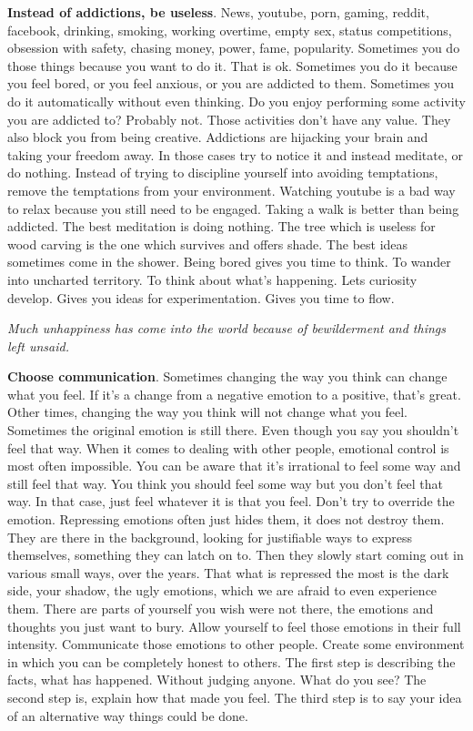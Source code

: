 \documentclass[a4paper,hidelinks]{article}
\begin{document}
\textbf{Instead of addictions, be useless}.
News, youtube, porn, gaming, reddit, facebook, drinking, smoking, working overtime, empty sex, status competitions, obsession with safety, chasing money, power, fame, popularity.
Sometimes you do those things because you want to do it.
That is ok.
Sometimes you do it because you feel bored, or you feel anxious, or you are addicted to them.
Sometimes you do it automatically without even thinking.
Do you enjoy performing some activity you are addicted to?
Probably not.
Those activities don't have any value.
They also block you from being creative.
Addictions are hijacking your brain and taking your freedom away.
In those cases try to notice it and instead meditate, or do nothing.
Instead of trying to discipline yourself into avoiding temptations, remove the temptations from your environment.
Watching youtube is a bad way to relax because you still need to be engaged.
Taking a walk is better than being addicted.
The best meditation is doing nothing.
The tree which is useless for wood carving is the one which survives and offers shade.
The best ideas sometimes come in the shower.
Being bored gives you time to think.
To wander into uncharted territory.
To think about what's happening.
Lets curiosity develop.
Gives you ideas for experimentation.
Gives you time to flow.

\newpage

\begin{center}
\textit{Much unhappiness has come into the world because of bewilderment and things left unsaid.}
\end{center}

\textbf{Choose communication}.
Sometimes changing the way you think can change what you feel.
If it's a change from a negative emotion to a positive, that's great.
Other times, changing the way you think will not change what you feel.
Sometimes the original emotion is still there.
Even though you say you shouldn't feel that way.
When it comes to dealing with other people, emotional control is most often impossible.
You can be aware that it's irrational to feel some way and still feel that way.
You think you should feel some way but you don't feel that way.
In that case, just feel whatever it is that you feel.
Don't try to override the emotion.
Repressing emotions often just hides them, it does not destroy them.
They are there in the background, looking for justifiable ways to express themselves, something they can latch on to.
Then they slowly start coming out in various small ways, over the years.
That what is repressed the most is the dark side, your shadow, the ugly emotions, which we are afraid to even experience them.
There are parts of yourself you wish were not there, the emotions and thoughts you just want to bury.
Allow yourself to feel those emotions in their full intensity.
Communicate those emotions to other people.
Create some environment in which you can be completely honest to others.
The first step is describing the facts, what has happened.
Without judging anyone.
What do you see?
The second step is, explain how that made you feel.
The third step is to say your idea of an alternative way things could be done.
\end{document}
